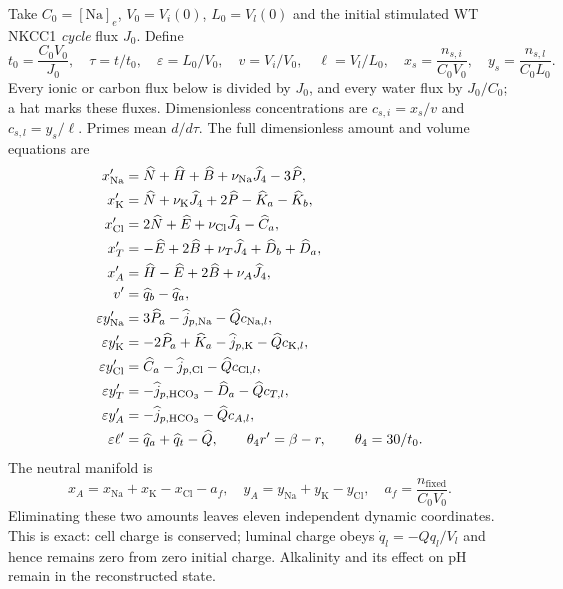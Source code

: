 Take $C_0=[\mathrm{Na}]_e$, $V_0=V_i(0)$, $L_0=V_l(0)$ and the initial
stimulated WT NKCC1 \emph{cycle} flux $J_0$.  Define
\[
 t_0=\frac{C_0V_0}{J_0},\quad \tau=t/t_0,\quad
 \varepsilon=L_0/V_0,\quad v=V_i/V_0,\quad \ell=V_l/L_0,
 \quad x_s=\frac{n_{s,i}}{C_0V_0},\quad y_s=\frac{n_{s,l}}{C_0L_0}.
\]
Every ionic or carbon flux below is divided by $J_0$, and every water flux
by $J_0/C_0$; a hat marks these fluxes.  Dimensionless concentrations are
$c_{s,i}=x_s/v$ and $c_{s,l}=y_s/\ell$.  Primes mean $d/d\tau$.
The full dimensionless amount and volume equations are
\begin{align}
 x_{\mathrm{Na}}'&=\widehat N+\widehat H+\widehat B+
                \nu_{\mathrm{Na}}\widehat J_4-3\widehat P,\notag\\
 x_{\mathrm K}'&=\widehat N+\nu_{\mathrm K}\widehat J_4+
                2\widehat P-\widehat K_a-\widehat K_b,\notag\\
 x_{\mathrm{Cl}}'&=2\widehat N+\widehat E+
                \nu_{\mathrm{Cl}}\widehat J_4-\widehat C_a,\notag\\
 x_T'&=-\widehat E+2\widehat B+\nu_T\widehat J_4+
                \widehat D_b+\widehat D_a,\notag\\
 x_A'&=\widehat H-\widehat E+2\widehat B+\nu_A\widehat J_4,\notag\\
 v'&=\widehat q_b-\widehat q_a,\label{eq:dimless-cell}\\
 \varepsilon y_{\mathrm{Na}}'&=3\widehat P_a-\widehat j_{p,\mathrm{Na}}
                -\widehat Q c_{\mathrm{Na},l},\notag\\
 \varepsilon y_{\mathrm K}'&=-2\widehat P_a+\widehat K_a-
                \widehat j_{p,\mathrm K}-\widehat Qc_{\mathrm K,l},\notag\\
 \varepsilon y_{\mathrm{Cl}}'&=\widehat C_a-\widehat j_{p,\mathrm{Cl}}
                -\widehat Qc_{\mathrm{Cl},l},\notag\\
 \varepsilon y_T'&=-\widehat j_{p,\mathrm{HCO}_3}-\widehat D_a-
                \widehat Qc_{T,l},\notag\\
 \varepsilon y_A'&=-\widehat j_{p,\mathrm{HCO}_3}-\widehat Qc_{A,l},\notag\\
 \varepsilon\ell'&=\widehat q_a+\widehat q_t-\widehat Q,
 \qquad \theta_4 r'=\beta-r,\qquad \theta_4=30/t_0.
 \label{eq:dimless-lumen}
\end{align}
The neutral manifold is
\begin{equation}
 x_A=x_{\mathrm{Na}}+x_{\mathrm K}-x_{\mathrm{Cl}}-a_f,
 \quad y_A=y_{\mathrm{Na}}+y_{\mathrm K}-y_{\mathrm{Cl}},
 \quad a_f=\frac{n_{\mathrm{fixed}}}{C_0V_0}.
 \label{eq:neutral-manifold}
\end{equation}
Eliminating these two amounts leaves eleven independent dynamic
coordinates.  This is exact: cell charge is conserved; luminal charge obeys
$\dot q_l=-Qq_l/V_l$ and hence remains zero from zero initial charge.
Alkalinity and its effect on pH remain in the reconstructed state.

